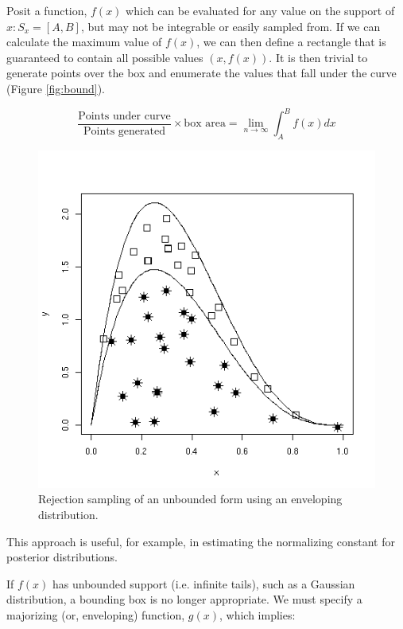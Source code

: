 \documentclass[]{book}
\begin{document}
Posit a function, $f(x)$ which can be evaluated for any value on the support of $x:S_x = [A,B]$, but may not be integrable or easily sampled from. If we can calculate the maximum  value of $f(x)$, we can then define a rectangle that is guaranteed to contain all possible values $(x,f(x))$. It is then trivial to generate points over the box and enumerate the values that fall under the curve (Figure \ref{fig:bound}).

\[
\frac{\mbox{Points under curve}}{\mbox{Points generated}} \times \mbox{box area} = \lim_{n \to \infty} \int_A^B f(x) dx
\]

\begin{figure}[h]
        \begin{center}
        \includegraphics[scale=0.4]{envelope.png}
    \end{center}
    \caption{Rejection sampling of an unbounded form using an enveloping distribution.}
    \label{fig:unbound}
\end{figure}

\noindent This approach is useful, for example, in estimating the normalizing constant for posterior distributions.

If $f(x)$ has unbounded support (i.e. infinite tails), such as a Gaussian distribution, a bounding box is no longer appropriate. We must specify a majorizing (or, enveloping) function, $g(x)$, which implies:
\end{document}
